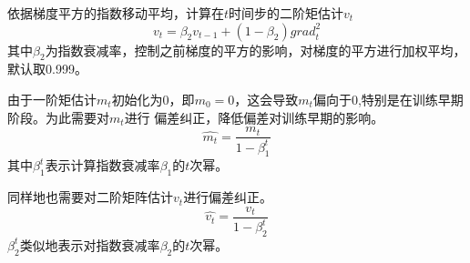 \noindent{}依据梯度平方的指数移动平均，计算在$t$时间步的二阶矩估计$v_{t}$
\begin{equation}
    v_{t} = \beta_{2} v_{t-1} + (1 - \beta_{2}) {grad}_{t}^{2}
\end{equation}
其中$\beta_{2}$为指数衰减率，控制之前梯度的平方的影响，对梯度的平方进行加权平均，默认取0.999。

\noindent{}由于一阶矩估计$m_{t}$初始化为0，即$m_{0} = 0$，这会导致$m_{t}$偏向于0,特别是在训练早期阶段。为此需要对$m_{t}$进行
偏差纠正，降低偏差对训练早期的影响。
\begin{equation}
    \widehat{m_t} = \frac{m_t}{1 - \beta_{1}^{t}}
\end{equation}
其中$\beta_{1}^{t}$表示计算指数衰减率$\beta_{1}$的$t$次幂。

\noindent{}同样地也需要对二阶矩阵估计$v_{t}$进行偏差纠正。
\begin{equation}
    \widehat{v_t} = \frac{v_t}{1 - \beta_{2}^{t}}
\end{equation}
$\beta_{2}^{t}$类似地表示对指数衰减率$\beta_{2}$的$t$次幂。

